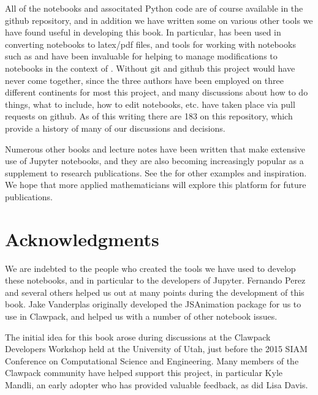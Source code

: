 \documentclass{SIAMbook2016}
\begin{document}
All of the notebooks and associtated Python code are of course available
in the github repository, and in addition we have written some
 on
various other tools we have found useful in developing this book. In
particular,  has
been used in converting notebooks to latex/pdf files, and tools for
working with notebooks such as
 and
 have been
invaluable for helping to manage modifications to notebooks in the
context of . Without git and github this
project would have never come together, since the three authors have
been employed on three different continents for most this project, and
many discussions about how to do things, what to include, how to edit
notebooks, etc. have taken place via pull requests on github. As of this
writing there are 183
 on this repository, which provide a history of many of
our discussions and decisions.

Numerous other books and lecture notes have been written that make
extensive use of Jupyter notebooks, and they are also becoming
increasingly popular as a supplement to research publications. See the
 for other examples and inspiration. We
hope that more applied mathematicians will explore this platform for
future publications.

\hypertarget{acknowledgments}{%
\section*{Acknowledgments}\label{acknowledgments}}

We are indebted to the people who created the tools we have used to
develop these notebooks, and in particular to the developers of Jupyter.
Fernando Perez and several others helped us out at many points during
the development of this book. Jake Vanderplas originally developed the
JSAnimation package for us to use in Clawpack, and helped us with a
number of other notebook issues.

The initial idea for this book arose during discussions at the Clawpack
Developers Workshop held at the University of Utah, just before the 2015
SIAM Conference on Computational Science and Engineering. Many members
of the Clawpack community have helped support this project, in
particular Kyle Mandli, an early adopter who has provided valuable
feedback, as did Lisa Davis.
\end{document}
